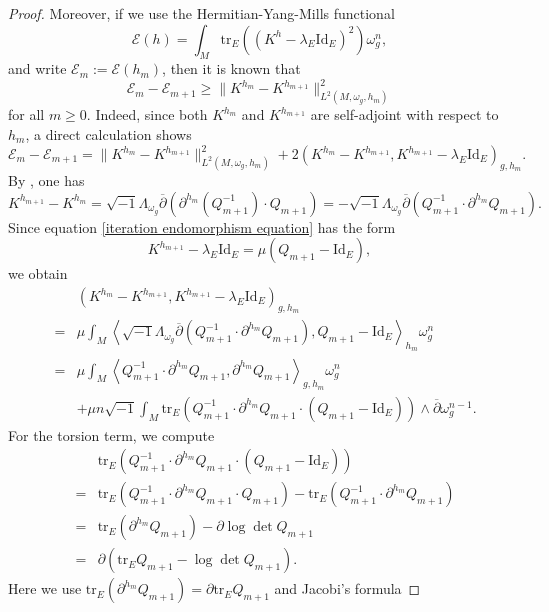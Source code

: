 \documentclass[12pt, reqno]{amsart}
\newcommand\cE{{\mathcal E}}
\newcommand{\id}{\mathrm{Id}}
\theoremstyle{plain}
\theoremstyle{definition}
\renewcommand{\bar}{\overline}
\newcommand{\beq}{\begin{equation}}
\newcommand{\eeq}{\end{equation}}
\renewcommand{\>}{\rightarrow}
\newcommand{\om}{\omega}
\newcommand{\tr}{\mathrm{tr}}
\numberwithin{equation}{section}
\begin{document}
\begin{proof}
	Moreover, if we use the Hermitian-Yang-Mills functional
	\beq  \cE(h)=\int_M\tr_E\left((K^h-\lambda_E\id_E)^2\right)\omega_g^n,\eeq 
	and write $\cE_m:=\cE(h_m)$, then it is known that 
	\beq \cE_m-\cE_{m+1}\geq \|K^{h_m}-K^{h_{m+1}}\|_{L^2(M,\om_g,h_m)}^2 \label{energy dissipation estimate}\eeq 
	for all $m\geq 0$. Indeed, since both $K^{h_m}$ and $K^{h_{m+1}}$ are self-adjoint with respect to $h_m$, 	a direct calculation shows
	\beq
	\cE_m-\cE_{m+1}
	=\|K^{h_m}-K^{h_{m+1}}\|_{L^2(M,\om_g,h_m)}^2 +2\left(K^{h_m}-K^{h_{m+1}},
	K^{h_{m+1}}-\lambda_E\id_E\right)_{g,h_m}.
	\label{energy polarization}
	\eeq 
	By \cite[Proposition~3.6]{WYY26+}, one has 
	\beq 
	K^{h_{m+1}}-K^{h_m}
	=\sqrt{-1}\Lambda_{\omega_g}\bar\partial
	\left(\partial^{h_m}(Q_{m+1}^{-1})\cdot Q_{m+1}\right)
	=-\sqrt{-1}\Lambda_{\omega_g}\bar\partial
	\left(Q_{m+1}^{-1}\cdot\partial^{h_m}Q_{m+1}\right).
	\eeq  Since equation \eqref{iteration endomorphism equation} has the form
	\beq 
	K^{h_{m+1}}-\lambda_E\id_E=\mu(Q_{m+1}-\id_E),
	\eeq
	we obtain
	\begin{eqnarray}
	&&\left(K^{h_m}-K^{h_{m+1}},
	K^{h_{m+1}}-\lambda_E\id_E\right)_{g,h_m}
	\nonumber\\
	&=&\mu\int_M
	\left\langle
	\sqrt{-1}\Lambda_{\omega_g}\bar\partial
	\left(Q_{m+1}^{-1}\cdot\partial^{h_m}Q_{m+1}\right),
	Q_{m+1}-\id_E
	\right\rangle_{h_m}\omega_g^n
	\nonumber\\
	&=&\mu\int_M
	\left\langle
	Q_{m+1}^{-1}\cdot\partial^{h_m}Q_{m+1},
	\partial^{h_m}Q_{m+1}
	\right\rangle_{g,h_m}\omega_g^n\nonumber\\
	&&+\mu n\sqrt{-1}\int_M
	\tr_E\left(Q_{m+1}^{-1}\cdot\partial^{h_m}Q_{m+1}\cdot(Q_{m+1}-\id_E)\right)
	\wedge\bar\partial\omega_g^{n-1}.
	\label{positive cross term with torsion}
	\end{eqnarray}
	For the torsion term, we compute
	\begin{eqnarray}
	&&\tr_E\left(Q_{m+1}^{-1}\cdot\partial^{h_m}Q_{m+1}\cdot(Q_{m+1}-\id_E)\right)
	\nonumber\\
	&=&
	\tr_E\left(Q_{m+1}^{-1}\cdot\partial^{h_m}Q_{m+1}\cdot Q_{m+1}\right)
	-\tr_E\left(Q_{m+1}^{-1}\cdot\partial^{h_m}Q_{m+1}\right)
	\nonumber\\
	&=&
	\tr_E\left(\partial^{h_m}Q_{m+1}\right)
	-\partial\log\det Q_{m+1}
	\nonumber\\
	&=&
	\partial\left(\tr_E Q_{m+1}-\log\det Q_{m+1}\right).
	\label{trace torsion identity}
	\end{eqnarray}
	Here we use $\tr_E(\partial^{h_m}Q_{m+1})=\partial\tr_E Q_{m+1}$ and  Jacobi's formula

\end{proof}
\end{document}
